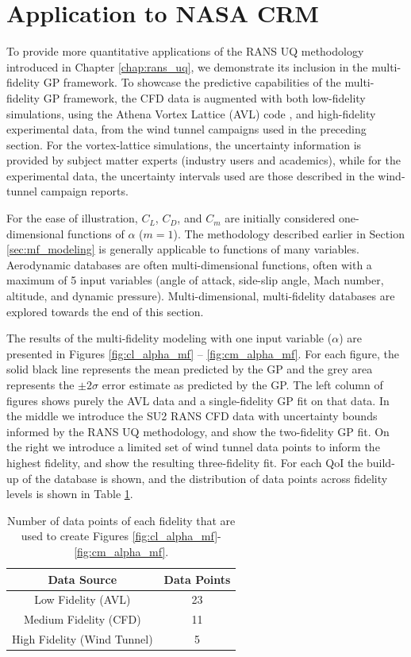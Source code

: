 \section{Application to NASA CRM} \label{sec:mf_gp_nasa_crm}

To provide more quantitative applications of the RANS UQ methodology introduced in Chapter \ref{chap:rans_uq}, we demonstrate its inclusion in the multi-fidelity GP framework.
To showcase the predictive capabilities of the multi-fidelity GP framework, the CFD data is augmented with both low-fidelity simulations, using the Athena Vortex Lattice (AVL) code \cite{drela2008athena}, and high-fidelity experimental data, from the wind tunnel campaigns \cite{rivers_further_2012,rivers_experimental_2010} used in the preceding section.
For the vortex-lattice simulations, the uncertainty information is provided by subject matter experts (industry users and academics), while for the experimental data, the uncertainty intervals used are those described in the wind-tunnel campaign reports. 

For the ease of illustration, $C_L$, $C_D$, and $C_m$ are initially considered one-dimensional functions of $\alpha$ ($m = 1$).
The methodology described earlier in Section \ref{sec:mf_modeling} is generally applicable to functions of many variables.
Aerodynamic databases are often multi-dimensional functions, often with a maximum of 5 input variables (angle of attack, side-slip angle, Mach number, altitude, and dynamic pressure).
Multi-dimensional, multi-fidelity databases are explored towards the end of this section. 

The results of the multi-fidelity modeling with one input variable ($\alpha$) are presented in Figures \ref{fig:cl_alpha_mf} -- \ref{fig:cm_alpha_mf}.
For each figure, the solid black line represents the mean predicted by the GP and the grey area represents the $\pm 2\sigma$ error estimate as predicted by the GP.
The left column of figures shows purely the AVL data and a single-fidelity GP fit on that data.
In the middle we introduce the SU2 RANS CFD data with uncertainty bounds informed by the RANS UQ methodology, and show the two-fidelity GP fit.
On the right we introduce a limited set of wind tunnel data points to inform the highest fidelity, and show the resulting three-fidelity fit.
For each QoI the build-up of the database is shown, and the distribution of data points across fidelity levels is shown in Table \ref{table:data_points}.

\begin{table}
\centering
    \renewcommand{\arraystretch}{1.2}
    \captionsetup{justification=centering}
    \caption{Number of data points of each fidelity that are used to create Figures \ref{fig:cl_alpha_mf}-\ref{fig:cm_alpha_mf}.} 
    \begin{tabular}{c|c}
        Data Source & Data Points \\ \hline
        Low Fidelity (AVL) & 23 \\ 
        Medium Fidelity (CFD) & 11 \\  
        High Fidelity (Wind Tunnel) & 5 \\  
    \end{tabular}
    \label{table:data_points}
\end{table}

